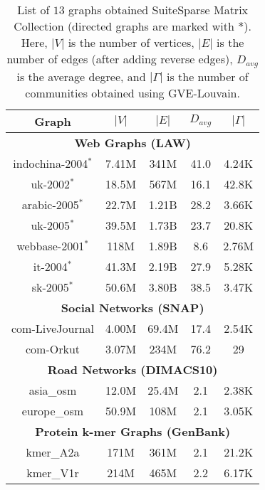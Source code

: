 \begin{table}[hbtp]
  \centering
  \caption{List of $13$ graphs obtained SuiteSparse Matrix Collection \cite{suite19} (directed graphs are marked with $*$). Here, $|V|$ is the number of vertices, $|E|$ is the number of edges (after adding reverse edges), $D_{avg}$ is the average degree, and $|\Gamma|$ is the number of communities obtained using GVE-Louvain.}
  \label{tab:dataset}
  \begin{tabular}{|c||c|c|c|c|}
    \toprule
    \textbf{Graph} &
    \textbf{\textbf{$|V|$}} &
    \textbf{\textbf{$|E|$}} &
    \textbf{\textbf{$D_{avg}$}} &
    \textbf{\textbf{$|\Gamma|$}} \\
    \midrule
    \multicolumn{5}{|c|}{\textbf{Web Graphs (LAW)}} \\ \hline
    indochina-2004$^*$ & 7.41M & 341M & 41.0 & 4.24K \\ \hline  %
    uk-2002$^*$ & 18.5M & 567M & 16.1 & 42.8K \\ \hline  %
    arabic-2005$^*$ & 22.7M & 1.21B & 28.2 & 3.66K \\ \hline  %
    uk-2005$^*$ & 39.5M & 1.73B & 23.7 & 20.8K \\ \hline  %
    webbase-2001$^*$ & 118M & 1.89B & 8.6 & 2.76M \\ \hline  %
    it-2004$^*$ & 41.3M & 2.19B & 27.9 & 5.28K \\ \hline  %
    sk-2005$^*$ & 50.6M & 3.80B & 38.5 & 3.47K \\ \hline  %
    \multicolumn{5}{|c|}{\textbf{Social Networks (SNAP)}} \\ \hline
    com-LiveJournal & 4.00M & 69.4M & 17.4 & 2.54K \\ \hline  %
    com-Orkut & 3.07M & 234M & 76.2 & 29 \\ \hline  %
    \multicolumn{5}{|c|}{\textbf{Road Networks (DIMACS10)}} \\ \hline
    asia\_osm & 12.0M & 25.4M & 2.1 & 2.38K \\ \hline  %
    europe\_osm & 50.9M & 108M & 2.1 & 3.05K \\ \hline  %
    \multicolumn{5}{|c|}{\textbf{Protein k-mer Graphs (GenBank)}} \\ \hline
    kmer\_A2a & 171M & 361M & 2.1 & 21.2K \\ \hline  %
    kmer\_V1r & 214M & 465M & 2.2 & 6.17K \\ \hline  %
  \bottomrule
  \end{tabular}
\end{table}
